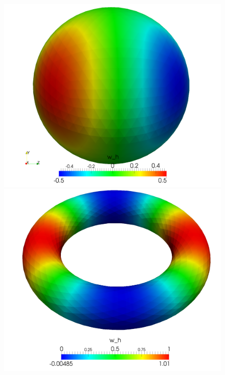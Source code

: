     \begin{figure}
      \begin{minipage}[t]{0.49\textwidth}
        \includegraphics[width=\textwidth]{bilder/laplaceSphere/DECSol1k.png}
      \end{minipage}
      \hfill
      \begin{minipage}[t]{0.49\textwidth}
        \includegraphics[width=\textwidth]{bilder/laplaceTorus/DECSol1k.png}
      \end{minipage}\\

\end{figure}
